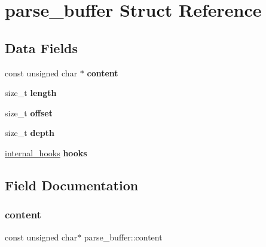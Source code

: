 \hypertarget{structparse__buffer}{}\section{parse\+\_\+buffer Struct Reference}
\label{structparse__buffer}
\subsection*{Data Fields}
\begin{DoxyCompactItemize}
\item 
\mbox{\label{structparse__buffer_a52ee1184576baa3d5171059ab0e942de}} 
const unsigned char $\ast$ {\bfseries content}
\item 
\mbox{\label{structparse__buffer_a036970e9335896d3cee8459eda9e2eb9}} 
size\+\_\+t {\bfseries length}
\item 
\mbox{\label{structparse__buffer_af727920073077579942a79de519bb31a}} 
size\+\_\+t {\bfseries offset}
\item 
\mbox{\label{structparse__buffer_af613c4ed7d73f76c60c50d1bcf4c67a0}} 
size\+\_\+t {\bfseries depth}
\item 
\mbox{\label{structparse__buffer_a2c3e99b15da2935fc5d58124ffb4a894}} 
\hyperlink{structinternal__hooks}{internal\+\_\+hooks} {\bfseries hooks}
\end{DoxyCompactItemize}


\subsection{Field Documentation}
\mbox{\label{structparse__buffer_a52ee1184576baa3d5171059ab0e942de}} 
\subsubsection{\texorpdfstring{content}{content}}
{\footnotesize\ttfamily const unsigned char$\ast$ parse\+\_\+buffer\+::content}

\mbox{\label{structparse__buffer_af613c4ed7d73f76c60c50d1bcf4c67a0}} 

